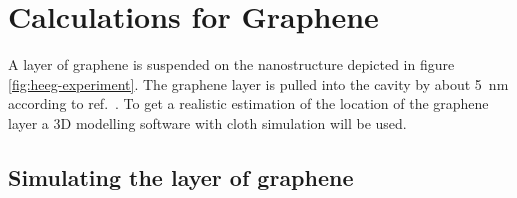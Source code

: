 \newpage
\section{Calculations for Graphene}
\label{sec:calculations}


A layer of graphene is suspended on the nanostructure depicted in figure \ref{fig:heeg-experiment}. The graphene layer is pulled into the cavity by about \SI{5}{nm} according to ref.~\cite{heeg}. To get a realistic estimation of the location of the graphene layer a 3D modelling software with cloth simulation will be used.

\subsection{Simulating the layer of graphene}

